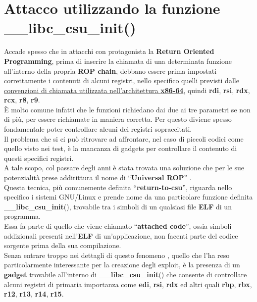 \section{Attacco utilizzando la funzione \_\_libc\_csu\_init()}
\label{sec:Attack_4}
Accade spesso che in attacchi con protagonista la \textbf{Return Oriented Programming}, prima di inserire la chiamata di una determinata funzione all'interno della propria \textbf{ROP chain}, debbano essere prima impostati correttamente i contenuti di alcuni registri, nello specifico quelli previsti dalle \hyperref[call-convention]{convenzioni di chiamata utilizzata nell'architettura \textbf{x86-64}}, 
quindi \textbf{rdi}, \textbf{rsi}, \textbf{rdx}, \textbf{rcx}, \textbf{r8}, \textbf{r9}.\\
È molto comune infatti che le funzioni richiedano dai due ai tre parametri se non di più, per essere richiamate in maniera corretta. Per questo diviene spesso fondamentale poter controllare alcuni dei registri sopraccitati.\\
Il problema che si ci può ritrovare ad affrontare, nel caso di piccoli codici come quello visto nei test, è la mancanza di gadgets per controllare il contenuto di questi specifici registri.\\
A tale scopo, col passare degli anni è stata trovata una soluzione che per le sue potenzialità prese addirittura il nome di ``\textbf{Universal ROP}'' \cite*{return-to-csu-challenge}.\\ 
Questa tecnica, più comunemente definita ``\textbf{return-to-csu}'', riguarda nello specifico i sistemi GNU/Linux e prende nome da una particolare funzione definita \textbf{\_\_libc\_csu\_init}(), trovabile tra i simboli di un qualsiasi file \textbf{ELF} di un programma.\\
Essa fa parte di quello che viene chiamato ``\textbf{attached code}'', ossia simboli addizionali presenti nell'\textbf{ELF} di un'applicazione, non facenti parte del codice sorgente prima della sua compilazione. \cite*{return-to-csu}\\
Senza entrare troppo nei dettagli di questo fenomeno \cite*{return-to-csu2}, quello che l'ha reso particolarmente interessante per la creazione degli exploit, è la presenza di un \textbf{gadget} trovabile all'interno di \textbf{\_\_libc\_csu\_init}() che consente di controllare alcuni registri di primaria importanza come \textbf{edi}, \textbf{rsi}, \textbf{rdx} ed altri quali \textbf{rbp}, \textbf{rbx}, \textbf{r12}, \textbf{r13}, \textbf{r14}, \textbf{r15}.\\

